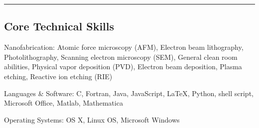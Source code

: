 \documentclass[10pt,letterpaper]{article}
\newenvironment{indentsection}[1]%
{\begin{list}{}%
	{\setlength{\leftmargin}{#1}}%
	\item[]%
}
{\end{list}}
\newcommand{\CPP}
{C\nolinebreak[4]\hspace{-.05em}\raisebox{.22ex}{\footnotesize\bf ++}}
\begin{document}






\hrule
\vspace{-0.4em}
\subsection*{Core Technical Skills}

\begin{indentsection}{\parindent}
\begin{description*}
	\item[Nanofabrication:]
	Atomic force microscopy (AFM), Electron beam lithography, Photolithography, Scanning electron microscopy (SEM), General clean room abilities, Physical vapor deposition (PVD), Electron beam deposition, Plasma etching, Reactive ion etching (RIE)
	\item[Languages \& Software:]
	\CPP, Fortran, Java, JavaScript, \LaTeX, Python, shell script, Microsoft Office, Matlab, Mathematica
	\item[Operating Systems:]
	OS X, Linux OS, Microsoft Windows
\end{description*}
\end{indentsection}
\end{document}
